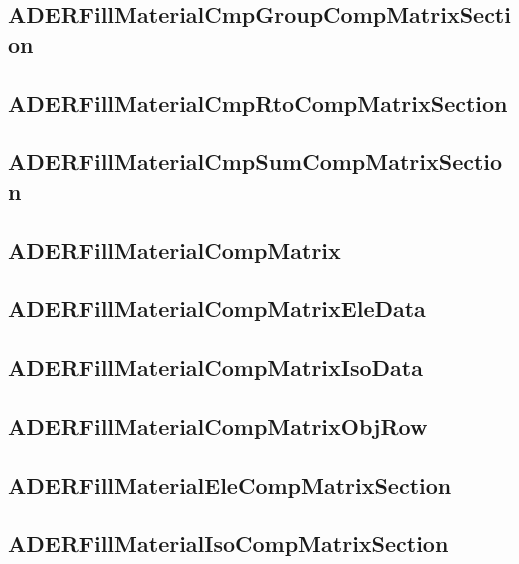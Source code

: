 \subsection{ADERFillMaterialCmpGroupCompMatrixSection}


\subsection{ADERFillMaterialCmpRtoCompMatrixSection}


\subsection{ADERFillMaterialCmpSumCompMatrixSection}


\subsection{ADERFillMaterialCompMatrix}


\subsection{ADERFillMaterialCompMatrixEleData}


\subsection{ADERFillMaterialCompMatrixIsoData}


\subsection{ADERFillMaterialCompMatrixObjRow}


\subsection{ADERFillMaterialEleCompMatrixSection}


\subsection{ADERFillMaterialIsoCompMatrixSection}


